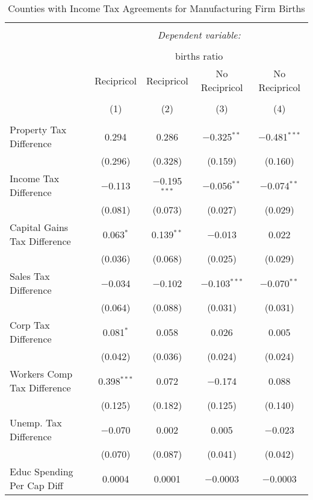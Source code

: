 
\begin{table}[!htbp] \centering 
  \caption{Counties with Income Tax Agreements for  Manufacturing Firm Births} 
  \label{31-33agreement} 
\begin{tabular}{@{\extracolsep{5pt}}lcccc} 
\\[-1.8ex]\hline 
\hline \\[-1.8ex] 
 & \multicolumn{4}{c}{\textit{Dependent variable:}} \\ 
\cline{2-5} 
\\[-1.8ex] & \multicolumn{4}{c}{births ratio} \\ 
 & Recipricol & Recipricol & No Recipricol & No Recipricol \\ 
\\[-1.8ex] & (1) & (2) & (3) & (4)\\ 
\hline \\[-1.8ex] 
 Property Tax Difference & 0.294 & 0.286 & $-$0.325$^{**}$ & $-$0.481$^{***}$ \\ 
  & (0.296) & (0.328) & (0.159) & (0.160) \\ 
  Income Tax Difference & $-$0.113 & $-$0.195$^{***}$ & $-$0.056$^{**}$ & $-$0.074$^{**}$ \\ 
  & (0.081) & (0.073) & (0.027) & (0.029) \\ 
  Capital Gains Tax Difference & 0.063$^{*}$ & 0.139$^{**}$ & $-$0.013 & 0.022 \\ 
  & (0.036) & (0.068) & (0.025) & (0.029) \\ 
  Sales Tax Difference & $-$0.034 & $-$0.102 & $-$0.103$^{***}$ & $-$0.070$^{**}$ \\ 
  & (0.064) & (0.088) & (0.031) & (0.031) \\ 
  Corp Tax Difference & 0.081$^{*}$ & 0.058 & 0.026 & 0.005 \\ 
  & (0.042) & (0.036) & (0.024) & (0.024) \\ 
  Workers Comp Tax Difference & 0.398$^{***}$ & 0.072 & $-$0.174 & 0.088 \\ 
  & (0.125) & (0.182) & (0.125) & (0.140) \\ 
  Unemp. Tax Difference & $-$0.070 & 0.002 & 0.005 & $-$0.023 \\ 
  & (0.070) & (0.087) & (0.041) & (0.042) \\ 
  Educ Spending Per Cap Diff & 0.0004 & 0.0001 & $-$0.0003 & $-$0.0003 \\ 

\end{tabular}
\end{table}
